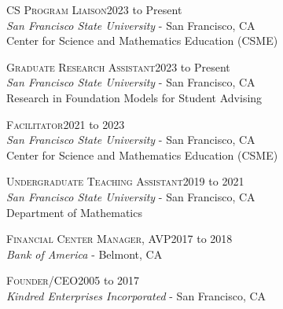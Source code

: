 \documentclass[hidelinks, 10pt]{article}
\begin{document}
{\begin{minipage}[ct]{0.9\linewidth}
\textsc{CS Program Liaison}\hfill 2023 to Present\\
{\emph{San Francisco State University} - San Francisco, CA}\\
Center for Science and Mathematics Education (CSME)
\end{minipage}

\vspace{2.5mm}

\begin{minipage}[ct]{0.9\linewidth}
\textsc{Graduate Research Assistant}\hfill 2023 to Present\\
{\emph{San Francisco State University} - San Francisco, CA}\\
Research in Foundation Models for Student Advising
\end{minipage}

\vspace{2.5mm}

\begin{minipage}[ct]{0.9\linewidth}
\textsc{Facilitator}\hfill 2021 to 2023\\
{\emph{San Francisco State University} - San Francisco, CA}\\
Center for Science and Mathematics Education (CSME)
\end{minipage}

\vspace{2.5mm}

\begin{minipage}[ct]{0.9\linewidth}
\textsc{Undergraduate Teaching Assistant}\hfill 2019 to 2021\\
{\emph{San Francisco State University} - San Francisco, CA}\\
Department of Mathematics
\end{minipage}

\vspace{2.5mm}

\begin{minipage}[ct]{0.9\linewidth}
\textsc{Financial Center Manager}, AVP\hfill 2017 to 2018\\
{\emph{Bank of America} - Belmont, CA}
\end{minipage}

\vspace{2.5mm}

\begin{minipage}[ct]{0.9\linewidth}
\textsc{Founder/CEO}\hfill 2005 to 2017\\
{\emph{Kindred Enterprises Incorporated} - San Francisco, CA}
\end{minipage}

}
\end{document}
